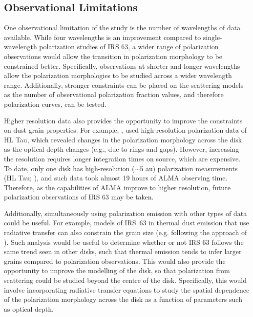 \subsection{Observational Limitations}


One observational limitation of the study is the number of wavelengths of data available. While four wavelengths is an improvement compared to single-wavelength polarization studies of IRS 63, a wider range of polarization observations would allow the transition in polarization morphology to be constrained better. Specifically, observations at shorter and longer wavelengths allow the polarization morphologies to be studied across a wider wavelength range. Additionally, stronger constraints can be placed on the scattering models as the number of observational polarization fraction values, and therefore polarization curves, can be tested. 




Higher resolution data also provides the opportunity to improve the constraints on dust grain properties. For example, \cite{Stephens2023}, used high-resolution polarization data of HL Tau, which revealed changes in the polarization morphology across the disk as the optical depth changes (e.g., due to rings and gaps). However, increasing the resolution requires longer integration times on source, which are expensive.  To date, only one disk has high-resolution ($\sim$5 au) polarization measurements (HL Tau; \cite{Stephens2023}), and such data took almost 19 hours of ALMA observing time. Therefore, as the capabilities of ALMA improve to higher resolution, future polarization observations of IRS 63 may be taken.

Additionally, simultaneously using polarization emission with other types of data could be useful. For example, models of IRS~63 in thermal dust emission that use radiative transfer can also constrain the grain size (e.g. following the approach of \cite{Carrasco}).  Such analysis would be useful to determine whether or not IRS 63 follows the same trend seen in other disks, such that thermal emission tends to infer larger grains compared to polarization observations. This would also provide the opportunity to improve the modelling of the disk, so that polarization from scattering could be studied beyond the centre of the disk. Specifically, this would involve incorporating radiative transfer equations to study the spatial dependence of the polarization morphology across the disk as a function of parameters such as optical depth.

